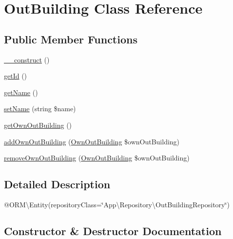 \hypertarget{class_app_1_1_entity_1_1_out_building}{}\section{Out\+Building Class Reference}
\label{class_app_1_1_entity_1_1_out_building}
\subsection*{Public Member Functions}
\begin{DoxyCompactItemize}
\item 
\mbox{\hyperlink{class_app_1_1_entity_1_1_out_building_a095c5d389db211932136b53f25f39685}{\+\_\+\+\_\+construct}} ()
\item 
\mbox{\hyperlink{class_app_1_1_entity_1_1_out_building_a12251d0c022e9e21c137a105ff683f13}{get\+Id}} ()
\item 
\mbox{\hyperlink{class_app_1_1_entity_1_1_out_building_a3d0963e68bb313b163a73f2803c64600}{get\+Name}} ()
\item 
\mbox{\hyperlink{class_app_1_1_entity_1_1_out_building_a392752b62c4f6aacea5c269690921ef3}{set\+Name}} (string \$name)
\item 
\mbox{\hyperlink{class_app_1_1_entity_1_1_out_building_aaf190d3aab26b67e86cfa0d759a0a9e6}{get\+Own\+Out\+Building}} ()
\item 
\mbox{\hyperlink{class_app_1_1_entity_1_1_out_building_a494be730fc915817fdc2643ccae26715}{add\+Own\+Out\+Building}} (\mbox{\hyperlink{class_app_1_1_entity_1_1_own_out_building}{Own\+Out\+Building}} \$own\+Out\+Building)
\item 
\mbox{\hyperlink{class_app_1_1_entity_1_1_out_building_a86b76f753808f1339ddca94a754da3d2}{remove\+Own\+Out\+Building}} (\mbox{\hyperlink{class_app_1_1_entity_1_1_own_out_building}{Own\+Out\+Building}} \$own\+Out\+Building)
\end{DoxyCompactItemize}


\subsection{Detailed Description}
@\+O\+RM\textbackslash{}\+Entity(repository\+Class=\char`\"{}\+App\textbackslash{}\+Repository\textbackslash{}\+Out\+Building\+Repository\char`\"{}) 

\subsection{Constructor \& Destructor Documentation}
\mbox{\label{class_app_1_1_entity_1_1_out_building_a095c5d389db211932136b53f25f39685}} 
